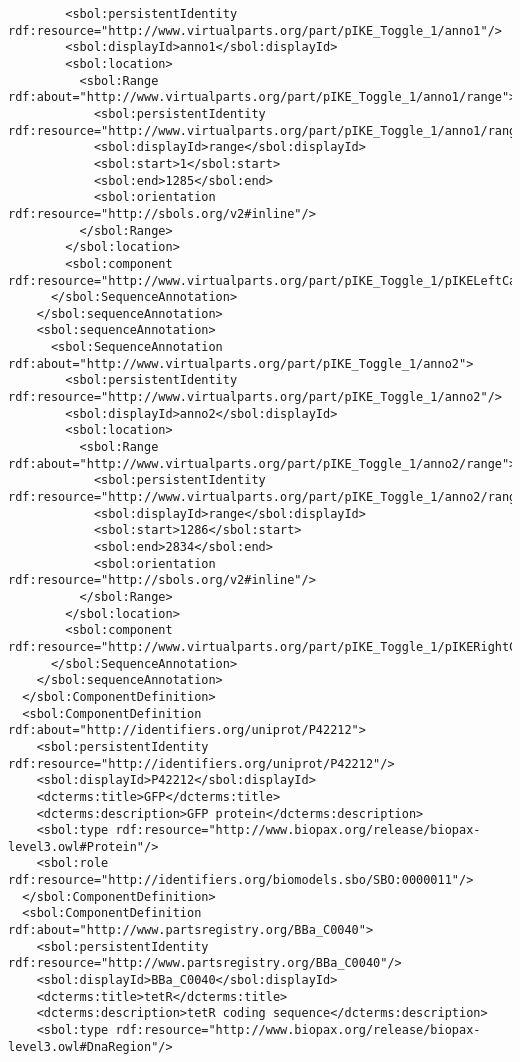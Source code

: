 \begin{lstlisting}
        <sbol:persistentIdentity rdf:resource="http://www.virtualparts.org/part/pIKE_Toggle_1/anno1"/>
        <sbol:displayId>anno1</sbol:displayId>
        <sbol:location>
          <sbol:Range rdf:about="http://www.virtualparts.org/part/pIKE_Toggle_1/anno1/range">
            <sbol:persistentIdentity rdf:resource="http://www.virtualparts.org/part/pIKE_Toggle_1/anno1/range"/>
            <sbol:displayId>range</sbol:displayId>
            <sbol:start>1</sbol:start>
            <sbol:end>1285</sbol:end>
            <sbol:orientation rdf:resource="http://sbols.org/v2#inline"/>
          </sbol:Range>
        </sbol:location>
        <sbol:component rdf:resource="http://www.virtualparts.org/part/pIKE_Toggle_1/pIKELeftCassette_1"/>
      </sbol:SequenceAnnotation>
    </sbol:sequenceAnnotation>
    <sbol:sequenceAnnotation>
      <sbol:SequenceAnnotation rdf:about="http://www.virtualparts.org/part/pIKE_Toggle_1/anno2">
        <sbol:persistentIdentity rdf:resource="http://www.virtualparts.org/part/pIKE_Toggle_1/anno2"/>
        <sbol:displayId>anno2</sbol:displayId>
        <sbol:location>
          <sbol:Range rdf:about="http://www.virtualparts.org/part/pIKE_Toggle_1/anno2/range">
            <sbol:persistentIdentity rdf:resource="http://www.virtualparts.org/part/pIKE_Toggle_1/anno2/range"/>
            <sbol:displayId>range</sbol:displayId>
            <sbol:start>1286</sbol:start>
            <sbol:end>2834</sbol:end>
            <sbol:orientation rdf:resource="http://sbols.org/v2#inline"/>
          </sbol:Range>
        </sbol:location>
        <sbol:component rdf:resource="http://www.virtualparts.org/part/pIKE_Toggle_1/pIKERightCassette_1"/>
      </sbol:SequenceAnnotation>
    </sbol:sequenceAnnotation>
  </sbol:ComponentDefinition>
  <sbol:ComponentDefinition rdf:about="http://identifiers.org/uniprot/P42212">
    <sbol:persistentIdentity rdf:resource="http://identifiers.org/uniprot/P42212"/>
    <sbol:displayId>P42212</sbol:displayId>
    <dcterms:title>GFP</dcterms:title>
    <dcterms:description>GFP protein</dcterms:description>
    <sbol:type rdf:resource="http://www.biopax.org/release/biopax-level3.owl#Protein"/>
    <sbol:role rdf:resource="http://identifiers.org/biomodels.sbo/SBO:0000011"/>
  </sbol:ComponentDefinition>
  <sbol:ComponentDefinition rdf:about="http://www.partsregistry.org/BBa_C0040">
    <sbol:persistentIdentity rdf:resource="http://www.partsregistry.org/BBa_C0040"/>
    <sbol:displayId>BBa_C0040</sbol:displayId>
    <dcterms:title>tetR</dcterms:title>
    <dcterms:description>tetR coding sequence</dcterms:description>
    <sbol:type rdf:resource="http://www.biopax.org/release/biopax-level3.owl#DnaRegion"/>

\end{lstlisting}
